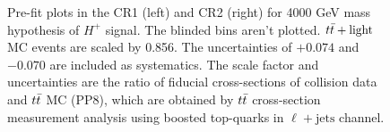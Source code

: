 \begin{figure}[H]
  \centering
  \caption{Pre-fit plots in the CR1 (left) and CR2 (right) for 4000 GeV mass hypothesis of $H^{+}$ signal. The blinded bins aren't plotted. $t\Bar{t}+\text{light}$ MC events are scaled by 0.856. The uncertainties of $+0.074$ and $-0.070$ are included as systematics. The scale factor and uncertainties are the ratio of fiducial cross-sections of collision data and $t\Bar{t}$ MC (PP8), which are obtained by $t\Bar{t}$ cross-section measurement analysis using boosted top-quarks in $\ell+\text{jets}$ channel.}
  \label{fig:Prefit_Hp4000_Blind_with_ttlight_constrained}
\end{figure}
